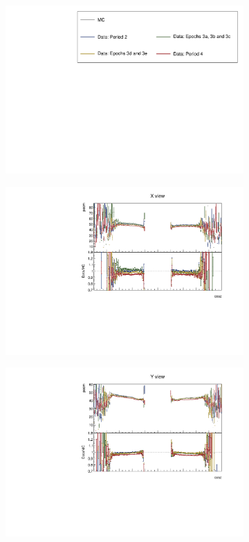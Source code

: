 \documentclass[12pt,a4paper]{article}
\begin{document}
\begin{figure}[!ht]
  \begin{subfigure}{\textwidth}
  \centering
    \includegraphics[height=0.2\linewidth]{essentialsec_tb/legend.pdf}
  \end{subfigure}
  \vspace*{2mm}
  
  \begin{subfigure}{0.5\textwidth}
    \includegraphics[width=\linewidth]{PlotsAngularDistribution/pecm_cosz_x.pdf}
  \end{subfigure}
  \begin{subfigure}{0.5\textwidth}
    \includegraphics[width=\linewidth]{PlotsAngularDistribution/pecm_cosz_y.pdf}

\end{subfigure}
\end{figure}
\end{document}
